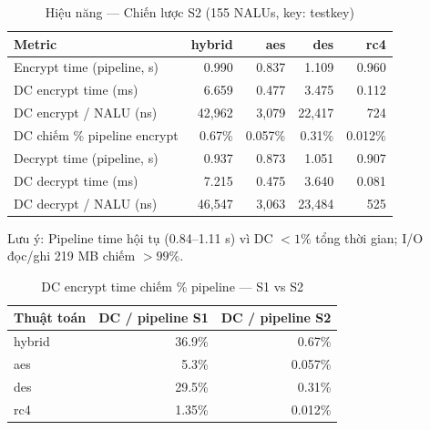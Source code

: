 \begin{table}[ht]
\centering
\caption{Hiệu năng — Chiến lược S2 (155 NALUs, key: testkey)}
\label{tab:perf_s2}
\begin{tabular}{|l|r|r|r|r|}
\hline
\textbf{Metric} & \textbf{hybrid} & \textbf{aes} & \textbf{des} & \textbf{rc4} \\
\hline
Encrypt time (pipeline, s)  & 0.990 & 0.837 & 1.109 & 0.960 \\
\hline
DC encrypt time (ms)        & 6.659 & 0.477 & 3.475 & 0.112 \\
\hline
DC encrypt / NALU (ns)      & 42{,}962 & 3{,}079 & 22{,}417 & 724 \\
\hline
DC chiếm \% pipeline encrypt & 0.67\% & 0.057\% & 0.31\% & 0.012\% \\
\hline
Decrypt time (pipeline, s)  & 0.937 & 0.873 & 1.051 & 0.907 \\
\hline
DC decrypt time (ms)        & 7.215 & 0.475 & 3.640 & 0.081 \\
\hline
DC decrypt / NALU (ns)      & 46{,}547 & 3{,}063 & 23{,}484 & 525 \\
\hline
\end{tabular}
\begin{tablenotes}
\small
\item Lưu ý: Pipeline time hội tụ (0.84--1.11 s) vì DC $< 1\%$ tổng thời gian;
I/O đọc/ghi 219 MB chiếm $> 99\%$.
\end{tablenotes}
\end{table}

\begin{table}[ht]
\centering
\caption{DC encrypt time chiếm \% pipeline — S1 vs S2}
\label{tab:dc_percent}
\begin{tabular}{|l|r|r|}
\hline
\textbf{Thuật toán} & \textbf{DC / pipeline S1} & \textbf{DC / pipeline S2} \\
\hline
hybrid & 36.9\% & 0.67\% \\
\hline
aes    &  5.3\% & 0.057\% \\
\hline
des    & 29.5\% & 0.31\% \\
\hline
rc4    &  1.35\% & 0.012\% \\
\hline
\end{tabular}
\end{table}

